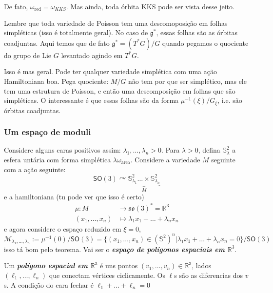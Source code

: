 \begin{exercise}\leavevmode
	De fato, $\omega_\operatorname{red}=\omega_{K K S}$. Mas ainda, toda órbita KKS pode ser vista desse jeito.
\end{exercise}

\begin{remark}\leavevmode
	Lembre que toda variedade de Poisson tem uma descomoposição em folhas simpléticas (isso é totalmente geral). No caso de $\mathfrak{g}^*$, essas folhas são as órbitas coadjuntas. Aqui temos que de fato  $\mathfrak{g}^*=(T^*G)/G$ quando pegamos o quociente do grupo de Lie $G$ levantado agindo em $T^*G$.

	Isso é mas geral. Pode ter qualquer variedade simplética com uma ação Hamiltoniana boa. Pega quociente: $M/G$  não tem por que ser simplético, mas ele tem uma estrutura de Poisson, e então uma descomposição em folhas que são simpléticas. O interessante é que essas folhas são da forma $\mu^{-1}(\xi)/G_\xi$, i.e. são órbitas coadjuntas.
\end{remark}

\subsubsection{Um espaço de moduli}

Considere alguns caras positivos assim: $\lambda_1,\ldots,\lambda_n>0$. Para $\lambda>0$, defina $\mathbb{S}^2_\lambda$ a esfera untária com forma simplética $\lambda\omega_{\operatorname{area}}$. Considere a variedade $M$ seguinte com a ação seguinte:
\[\mathsf{SO}(3) \curvearrowright \underbrace{\mathbb{S}^2_{\lambda_1}\ldots \times \mathbb{S}^2_{\lambda_n}}_{M}\]
e a hamiltoniana (tu pode ver que isso é certo)
\begin{align*}
	\mu: M &\longrightarrow \mathfrak{so}(3)^*=\mathbb{R}^3 \\
	(x_1,\ldots,x_n) &\longmapsto \lambda_1x_1+\ldots +\lambda_nx_n
\end{align*}
e agora considere o espaço reduzido em $\xi=0$,
\[\mathcal{M}_{\lambda_1,\ldots,\lambda_n}:=\mu^{-1}(0)/\mathsf{SO}(3) =\{(x_1,\ldots,x_n)\in(\mathbb{S}^2)^n|\lambda_1x_1+\ldots +\lambda_nx_n=0\} \Big/\mathsf{SO}(3)\]
isso tá bom pelo teorema. Vai ser o \textit{\textbf{espaço de polígonos espaciais em $\mathbb{R}^{3}$}}.

\begin{defn}\leavevmode
	Um \textit{\textbf{polígono espacial em $\mathbb{R}^{3}$}} é uns pontos $(v_1,\ldots,v_n)\in\mathbb{R}^{3}$, lados $(\ell_1,\ldots,\ell_n)$ que conectam vértices ciclicamente. Os $\ell$s são as diferencias dos $v$s. A condição do cara fechar é $\ell_1+\ldots +\ell_n=0$
\end{defn}

